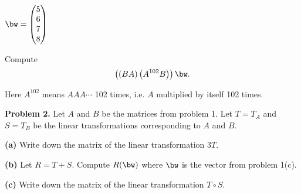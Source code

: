 \documentclass[oneside,12pt]{amsart}
\begin{document}
$
\bw = \begin{pmatrix}
5 \\
6 \\
7 \\
8 \\
\end{pmatrix}
$
\bigskip
\bigskip
\bigskip

Compute $$\left((BA) \left(A^{102}  B\right) \right ) \bw.$$

Here $A^{102}$ means
$A A A \cdots$ 102 times, i.e. $A$ multiplied by itself 102 times.

\bigskip
\bigskip
\bigskip
\bigskip
\bigskip
\bigskip

\textbf{Problem 2.} Let $A$ and $B$ be the matrices from problem 1.
Let $T=T_A$ and $S = T_B$ be the linear transformations corresponding to
$A$ and $B$.

\smallskip

\textbf{(a)} Write down the matrix of the linear transformation $3 T$.

\bigskip
\bigskip
\bigskip
\bigskip
\bigskip
\bigskip


\textbf{(b)} Let $R = T + S$. Compute $R(\bw)$ where $\bw$ is the vector from problem 1(c).

\bigskip
\bigskip
\bigskip
\bigskip
\bigskip
\bigskip

\textbf{(c)} Write down the matrix of the linear transformation $T \circ S$.
\end{document}
